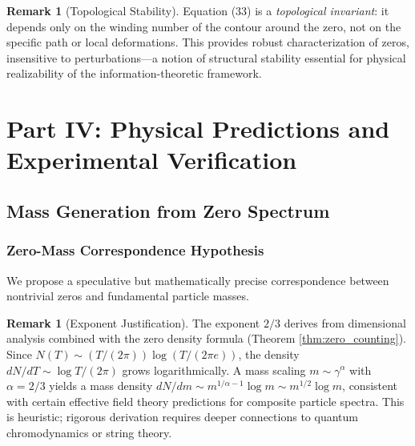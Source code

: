 \documentclass[12pt]{article}
\theoremstyle{plain}
\theoremstyle{definition}
\newtheorem{remark}[theorem]{Remark}
\begin{document}
\begin{remark}[Topological Stability]
Equation (33) is a \emph{topological invariant}: it depends only on the winding number of the contour around the zero, not on the specific path or local deformations. This provides robust characterization of zeros, insensitive to perturbations—a notion of structural stability essential for physical realizability of the information-theoretic framework.
\end{remark}

\section{Part IV: Physical Predictions and Experimental Verification}

\subsection{Mass Generation from Zero Spectrum}

\subsubsection{Zero-Mass Correspondence Hypothesis}

We propose a speculative but mathematically precise correspondence between nontrivial zeros and fundamental particle masses.


\begin{remark}[Exponent Justification]
The exponent $2/3$ derives from dimensional analysis combined with the zero density formula (Theorem \ref{thm:zero_counting}). Since $N(T) \sim (T/(2\pi)) \log(T/(2\pi e))$, the density $dN/dT \sim \log T / (2\pi)$ grows logarithmically. A mass scaling $m \sim \gamma^{\alpha}$ with $\alpha = 2/3$ yields a mass density $dN/dm \sim m^{1/\alpha - 1} \log m \sim m^{1/2} \log m$, consistent with certain effective field theory predictions for composite particle spectra. This is heuristic; rigorous derivation requires deeper connections to quantum chromodynamics or string theory.
\end{remark}
\end{document}
